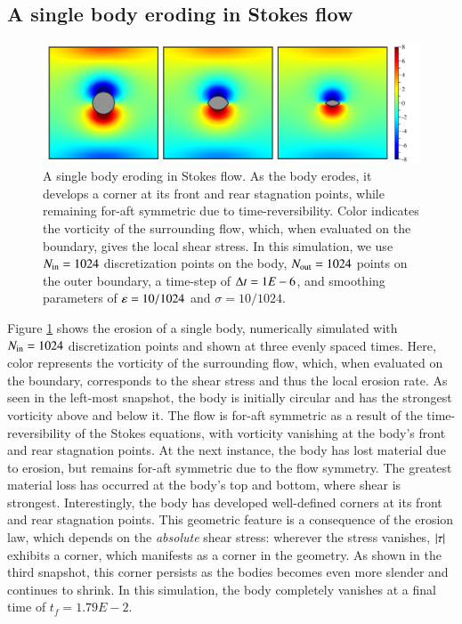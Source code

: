 \documentclass[preprint, 10pt]{elsarticle}
\begin{document}
\subsection{A single body eroding in Stokes flow}

\begin{figure}%
\begin{center}
\includegraphics[width = 0.80 \textwidth]{./figs/01bodseq.pdf}
\caption{A single body eroding in Stokes flow. As the body erodes, it develops a corner at its front and rear stagnation points, while remaining for-aft symmetric due to time-reversibility. Color indicates the vorticity of the surrounding flow, which, when evaluated on the boundary, gives the local shear stress. In this simulation, we use $N_{\mathrm{in}} = 1024$ discretization points on the body, $N_{\mathrm{out}} = 1024$ points on the outer boundary, a time-step of $\Delta t = 1E-6$, and smoothing parameters of $\varepsilon = 10/1024$ and $\sigma = 10/1024$.}
\label{01bodseq} 
\end{center}
\end{figure}

Figure \ref{01bodseq} shows the erosion of a single body, numerically simulated with $N_{\mathrm{in}} = 1024$ discretization points and shown at three evenly spaced times. Here, color represents the vorticity of the surrounding flow, which, when evaluated on the boundary, corresponds to the shear stress and thus the local erosion rate. As seen in the left-most snapshot, the body is initially circular and has the strongest vorticity above and below it. The flow is for-aft symmetric as a result of the time-reversibility of the Stokes equations, with vorticity vanishing at the body's front and rear stagnation points. 
At the next instance, the body has lost material due to erosion, but remains for-aft symmetric due to the flow symmetry. The greatest material loss has occurred at the body's top and bottom, where shear is strongest. Interestingly, the body has developed well-defined corners at its front and rear stagnation points. This geometric feature is a consequence of the erosion law, which depends on the {\em absolute} shear stress: wherever the stress vanishes, $\lvert \tau \rvert$ exhibits a corner, which manifests as a corner in the geometry. As shown in the third snapshot, this corner persists as the bodies becomes even more slender and continues to shrink. In this simulation, the body completely vanishes at a final time of $t_f = 1.79E-2$.
\end{document}
